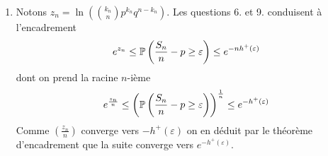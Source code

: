 \begin{enumerate}
\begin{enumerate}
\end{enumerate}

 \item Notons $z_n = \ln\left( \binom{k_n}{n} p^{k_n}q^{n-k_n}\right)$. Les questions 6. et 9. conduisent à l'encadrement
\begin{displaymath}
 e^{z_n} \leq \P\left( \frac{S_n}{n}-p\geq \varepsilon\right) \leq e^{-nh^+(\varepsilon)}
\end{displaymath}
dont on prend la racine $n$-ième
\begin{displaymath}
 e^{\frac{z_n}{n}} \leq \left( \P\left( \frac{S_n}{n}-p\geq \varepsilon\right)\right)^{\frac{1}{n}}  \leq e^{-h^+(\varepsilon)}
\end{displaymath}
Comme $(\frac{z_n}{n})$ converge vers $-h^+(\varepsilon)$ on en déduit par le théorème d'encadrement que la suite converge vers $e^{-h^+(\varepsilon)}$. 
\end{enumerate}
